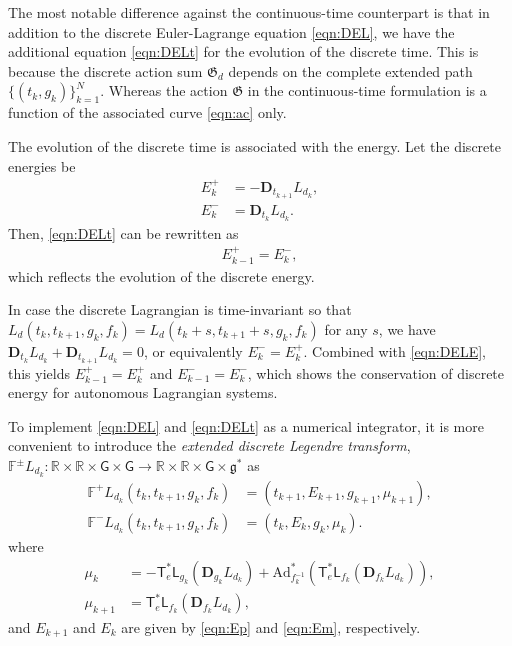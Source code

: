 \documentclass[letterpaper, 10pt, conference]{ieeeconf}
\newcommand{\G}{\ensuremath{\mathsf{G}}}
\newcommand{\T}{\ensuremath{\mathsf{T}}}
\renewcommand{\L}{\ensuremath{\mathsf{L}}}
\renewcommand{\Re}{\ensuremath{\mathbb{R}}}
\newcommand{\D}{\ensuremath{\mathbf{D}}}
\newcommand{\Ad}{\ensuremath{\mathrm{Ad}}}
\newcommand{\g}{\ensuremath{\mathfrak{g}}}
\begin{document}
The most notable difference against the continuous-time counterpart is that in addition to the discrete Euler-Lagrange equation \eqref{eqn:DEL}, we have the additional equation \eqref{eqn:DELt} for the evolution of the discrete time. 
This is because the discrete action sum $\mathfrak{G}_d$ depends on the complete extended path $\{(t_k,g_k)\}_{k=1}^N$.
Whereas the action $\mathfrak{G}$ in the continuous-time formulation is a function of the associated curve \eqref{eqn:ac} only.

The evolution of the discrete time is associated with the energy.
Let the discrete energies be
\begin{align}
    E^+_k &= - \D_{t_{k+1}} L_{d_k},\label{eqn:Ep}\\
    E^-_k &= \D_{t_{k}} L_{d_k}.\label{eqn:Em}
\end{align}
Then, \eqref{eqn:DELt} can be rewritten as
\begin{align}
    E^+_{k-1} = E^-_k,\label{eqn:DELE}
\end{align}
which reflects the evolution of the discrete energy.

In case the discrete Lagrangian is time-invariant so that $L_d(t_k,t_{k+1},g_k,f_k) =  L_d(t_k+s,t_{k+1}+s,g_k,f_k)$ for any $s$, 
we have $\D_{t_k}L_{d_k} + \D_{t_{k+1}}L_{d_k}=0$, or equivalently $E^-_k = E^+_k$. 
Combined with \eqref{eqn:DELE}, this yields $E_{k-1}^+ = E_k^+$ and $E_{k-1}^-=E_k^-$, which shows the conservation of discrete energy for autonomous Lagrangian systems. 

To implement \eqref{eqn:DEL} and \eqref{eqn:DELt} as a numerical integrator, it is more convenient to introduce the \textit{extended discrete Legendre transform}, $\mathbb{F}^\pm L_{d_k}: \Re\times\Re \times \G \times \G \rightarrow \Re\times \Re\times\G\times\g^*$ as
\begin{align}
    \mathbb{F}^+ L_{d_k} (t_k,t_{k+1}, g_k,f_k) & = (t_{k+1}, E_{k+1}, g_{k+1}, \mu_{k+1}),\\
    \mathbb{F}^- L_{d_k} (t_k,t_{k+1}, g_k,f_k) & = (t_k, E_k, g_{k}, \mu_{k}).
\end{align}
where
\begin{align}
    \mu_k & = -\T^*_e\L_{g_k}(\D_{g_k} L_{d_k})+ \Ad^*_{f_k^{-1}} (\T^*_e\L_{f_k}(\D_{f_k} L_{d_k})),\label{eqn:muk}\\
    \mu_{k+1} & = \T^*_e\L_{f_k} (\D_{f_k} L_{d_k}),\label{eqn:mukp}
\end{align}
and $E_{k+1}$ and $E_k$ are given by \eqref{eqn:Ep} and \eqref{eqn:Em}, respectively. 
\end{document}
